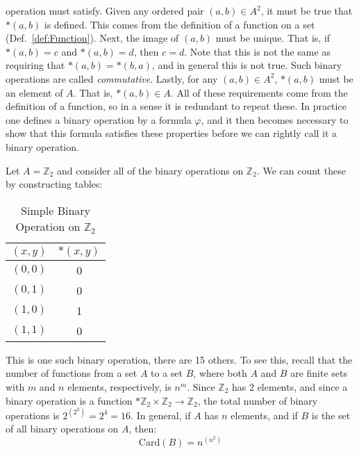     operation must satisfy. Given any ordered pair $(a,b)\in{A}^{2}$, it must
    be true that $*(a,b)$ is defined. This comes from the definition of a
    function on a set (Def.~\ref{def:Function}). Next, the image of $(a,b)$ must
    be unique. That is, if $*(a,b)=c$ and $*(a,b)=d$, then $c=d$. Note that this
    is not the same as requiring that $*(a,b)=*(b,a)$, and in general this is
    not true. Such binary operations are called
    \textit{commutative}. Lastly, for any
    $(a,b)\in{A}^{2}$, $*(a,b)$ must be an element of $A$. That is,
    $*(a,b)\in{A}$. All of these requirements come from the definition of a
    function, so in a sense it is redundant to repeat these. In practice one
    defines a binary operation by a formula $\varphi$, and it then becomes
    necessary to show that this formula satisfies these properties before we can
    rightly call it a binary operation.
    \begin{example}
        Let $A=\mathbb{Z}_{2}$ and consider all of the binary operations on
        $\mathbb{Z}_{2}$. We can count these by constructing tables:
        \begin{table}[H]
            \centering
            \begin{tabular}{c|c}
                $(x,y)$&$*(x,y)$\\
                \hline
                $(0,0)$&0\\
                $(0,1)$&0\\
                $(1,0)$&1\\
                $(1,1)$&0
            \end{tabular}
            \label{tab:Binary_Operation_on_Z_2}
            \caption{Simple Binary Operation on $\mathbb{Z}_{2}$}
        \end{table}
        This is one such binary operation, there are 15 others. To see this,
        recall that the number of functions from a set $A$ to a set $B$, where
        both $A$ and $B$ are finite sets with $m$ and $n$ elements,
        respectively, is $n^{m}$. Since $\mathbb{Z}_{2}$ has 2 elements, and
        since a binary operation is a function
        $*\mathbb{Z}_{2}\times\mathbb{Z}_{2}\rightarrow\mathbb{Z}_{2}$, the
        total number of binary operations is $2^{(2^{2})}=2^{4}=16$. In general,
        if $A$ has $n$ elements, and if $B$ is the set of all binary operations
        on $A$, then:
        \begin{equation}
            \textrm{Card}(B)=n^{(n^2)}
        \end{equation}
    \end{example}
